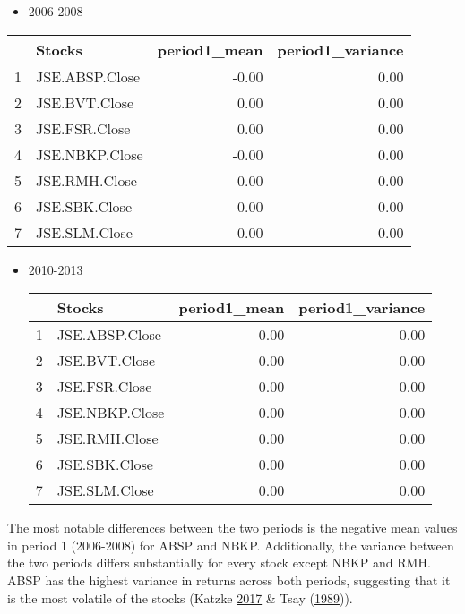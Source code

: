 \documentclass[11pt,preprint, authoryear]{elsarticle}
\let\origtable\table
\let\endorigtable\endtable
\renewenvironment{table}[1][2] {
    \expandafter\origtable\expandafter[H]
} {
    \endorigtable
}
\numberwithin{equation}{section}
\numberwithin{figure}{section}
\numberwithin{table}{section}
\def\tightlist{} %
\begin{document}
\begin{itemize}
\tightlist
\item
  2006-2008
\end{itemize}

\begin{table}[H]
\centering
\begin{tabular}{rlrr}
  \hline
 & Stocks & period1\_mean & period1\_variance \\ 
  \hline
1 & JSE.ABSP.Close & -0.00 & 0.00 \\ 
  2 & JSE.BVT.Close & 0.00 & 0.00 \\ 
  3 & JSE.FSR.Close & 0.00 & 0.00 \\ 
  4 & JSE.NBKP.Close & -0.00 & 0.00 \\ 
  5 & JSE.RMH.Close & 0.00 & 0.00 \\ 
  6 & JSE.SBK.Close & 0.00 & 0.00 \\ 
  7 & JSE.SLM.Close & 0.00 & 0.00 \\ 
   \hline
\end{tabular}
\caption{Moments of the stocks for 2006-2008 \label{tab1}} 
\end{table}

\begin{itemize}
\tightlist
\item
  2010-2013

  \begin{table}[H]
  \centering
  \begin{tabular}{rlrr}
    \hline
   & Stocks & period1\_mean & period1\_variance \\ 
    \hline
  1 & JSE.ABSP.Close & 0.00 & 0.00 \\ 
    2 & JSE.BVT.Close & 0.00 & 0.00 \\ 
    3 & JSE.FSR.Close & 0.00 & 0.00 \\ 
    4 & JSE.NBKP.Close & 0.00 & 0.00 \\ 
    5 & JSE.RMH.Close & 0.00 & 0.00 \\ 
    6 & JSE.SBK.Close & 0.00 & 0.00 \\ 
    7 & JSE.SLM.Close & 0.00 & 0.00 \\ 
     \hline
  \end{tabular}
  \caption{Moments of the stocks for 2010-2013 \label{tab1}} 
  \end{table}
\end{itemize}

The most notable differences between the two periods is the negative
mean values in period 1 (2006-2008) for ABSP and NBKP. Additionally, the
variance between the two periods differs substantially for every stock
except NBKP and RMH. ABSP has the highest variance in returns across
both periods, suggesting that it is the most volatile of the stocks
(Katzke \protect\hyperlink{ref-Texevier}{2017} \& Tsay
(\protect\hyperlink{ref-Tsay1989}{1989})).
\end{document}
